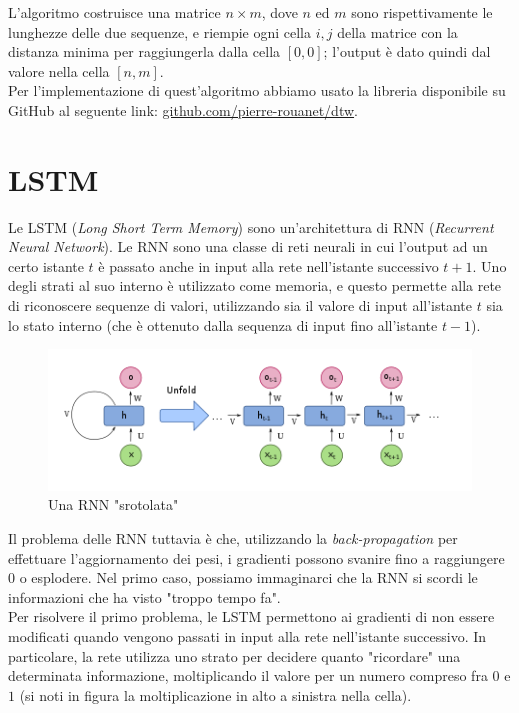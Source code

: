 \documentclass[8pt,notitlepage]{report}
\begin{document}
		L'algoritmo costruisce una matrice $ n \times m $, dove $ n $ ed $ m $ sono rispettivamente le lunghezze delle due sequenze, e riempie ogni cella $ i, j $ della matrice con la distanza minima per raggiungerla dalla cella $ [0, 0] $; l'output è dato quindi dal valore nella cella $ [n, m] $. \\
		Per l'implementazione di quest'algoritmo abbiamo usato la libreria disponibile su GitHub al seguente link: \href{https://github.com/pierre-rouanet/dtw}{github.com/pierre-rouanet/dtw}.
		

	\section{LSTM}
		Le LSTM (\textit{Long Short Term Memory}) sono un'architettura di RNN (\textit{Recurrent Neural Network}). Le RNN sono una classe di reti neurali in cui l'output ad un certo istante $ t $ è passato anche in input alla rete nell'istante successivo $ t + 1 $. Uno degli strati al suo interno è utilizzato come memoria, e questo permette alla rete di riconoscere sequenze di valori, utilizzando sia il valore di input all'istante $ t $ sia lo stato interno (che è ottenuto dalla sequenza di input fino all'istante $ t - 1 $). 
		
		\begin{figure}[H]
			\begin{center}
				\includegraphics[scale=.55]{rnn}
				\caption{Una RNN "srotolata"}
			\end{center}
		\end{figure}
		
		Il problema delle RNN tuttavia è che, utilizzando la \textit{back-propagation} per effettuare l'aggiornamento dei pesi, i gradienti possono svanire fino a raggiungere $ 0 $ o esplodere. Nel primo caso, possiamo immaginarci che la RNN si scordi le informazioni che ha visto "troppo tempo fa". \\
		Per risolvere il primo problema, le LSTM permettono ai gradienti di non essere modificati quando vengono passati in input alla rete nell'istante successivo. In particolare, la rete utilizza uno strato per decidere quanto "ricordare" una determinata informazione, moltiplicando il valore per un numero compreso fra $ 0 $ e $ 1 $ (si noti in figura la moltiplicazione in alto a sinistra nella cella).
		
\end{document}
